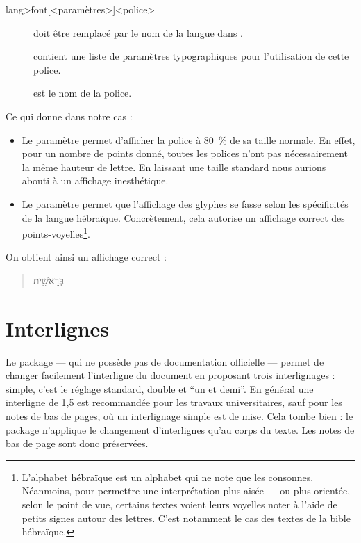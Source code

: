 \begin{latexcode}
\newfontfamily\<lang>font[<paramètres>]{<police>}
\end{latexcode}

\begin{description}
\item[]doit être remplacé par le nom de la langue dans .
\item[]contient une liste de paramètres typographiques pour l'utilisation de cette police.
\item[]est le nom de la police.
\end{description}

Ce qui donne dans notre cas :
\begin{latexcode}
\newfontfamily{}
\end{latexcode}

\begin{itemize}
\item Le paramètre  permet d'afficher la police à 80~\% de sa taille normale. En effet, pour un nombre de points donné, toutes les polices n'ont pas nécessairement la même hauteur de lettre. En  laissant une taille standard nous aurions abouti à un affichage inesthétique.
\item Le paramètre  permet que l'affichage des glyphes se fasse selon les spécificités de la langue hébraïque. Concrètement, cela autorise un affichage correct des points-voyelles\footnote{L'alphabet hébraïque est un alphabet qui ne note que les consonnes. Néanmoins, pour permettre une interprétation plus aisée --- ou plus orientée, selon le point de vue, certains textes voient leurs voyelles noter à l'aide de petits signes autour des lettres. C'est notamment le cas des textes de la bible hébraïque\parencite[Voir][]{massorete}.}. 
\end{itemize}

On obtient ainsi un affichage correct :
\begin{quotation}
\texthebrew{בְּרֵאשִׁ֖ית}
\end{quotation}
\section{Interlignes}\label{interligne}

Le package  --- qui ne possède pas de documentation officielle --- permet de changer facilement l'interligne du document en proposant trois interlignages : simple, c'est le réglage standard, double et \enquote{un et demi}. En général une interligne de 1,5 est recommandée pour les travaux universitaires, sauf pour les notes de bas de pages, où un interlignage simple est de mise. Cela tombe bien : le package n'applique le changement d'interlignes qu'au corps du texte. Les notes de bas de page sont donc préservées.

